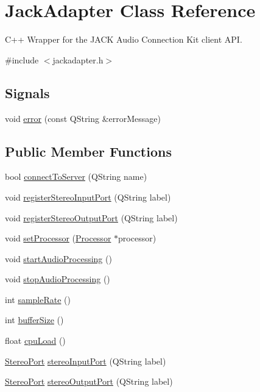 \hypertarget{classJackAdapter}{\section{\-Jack\-Adapter \-Class \-Reference}
\label{d7/d2c/classJackAdapter}
}


\-C++ \-Wrapper for the \-J\-A\-C\-K \-Audio \-Connection \-Kit client \-A\-P\-I.  




{\ttfamily \#include $<$jackadapter.\-h$>$}

\subsection*{\-Signals}
\begin{DoxyCompactItemize}
\item 
void \hyperlink{classJackAdapter_a55123c4a317c8c6c2a186b6a66867902}{error} (const \-Q\-String \&error\-Message)
\end{DoxyCompactItemize}
\subsection*{\-Public \-Member \-Functions}
\begin{DoxyCompactItemize}
\item 
bool \hyperlink{classJackAdapter_a221a1ac7a60ab38558de730c64428af7}{connect\-To\-Server} (\-Q\-String name)
\item 
void \hyperlink{classJackAdapter_a675123d2fa6f327d18985fecf305bb56}{register\-Stereo\-Input\-Port} (\-Q\-String label)
\item 
void \hyperlink{classJackAdapter_a3cbec70a8bbaecb9f4d1fbdbdbf5a4fd}{register\-Stereo\-Output\-Port} (\-Q\-String label)
\item 
void \hyperlink{classJackAdapter_a69d25a5529343586d8c8f3c2b5b32be1}{set\-Processor} (\hyperlink{classProcessor}{\-Processor} $\ast$processor)
\item 
void \hyperlink{classJackAdapter_ada1468e1b1b4f853d017c480e6b989a4}{start\-Audio\-Processing} ()
\item 
void \hyperlink{classJackAdapter_aa8bdeea946ee8d2e67920e7eb355d74e}{stop\-Audio\-Processing} ()
\item 
int \hyperlink{classJackAdapter_ab66793a663a251a706f4c7b4843fed88}{sample\-Rate} ()
\item 
int \hyperlink{classJackAdapter_a6a957ded47affe20ca51e98f87124a42}{buffer\-Size} ()
\item 
float \hyperlink{classJackAdapter_afa5994297183b374b8a01e6fa683a654}{cpu\-Load} ()
\item 
\hyperlink{structStereoPort}{\-Stereo\-Port} \hyperlink{classJackAdapter_a0f52179d6826823348d4b336d40aa71e}{stereo\-Input\-Port} (\-Q\-String label)
\item 
\hyperlink{structStereoPort}{\-Stereo\-Port} \hyperlink{classJackAdapter_a4b480c31bfe78d7e64b342014aacab2c}{stereo\-Output\-Port} (\-Q\-String label)
\end{DoxyCompactItemize}
